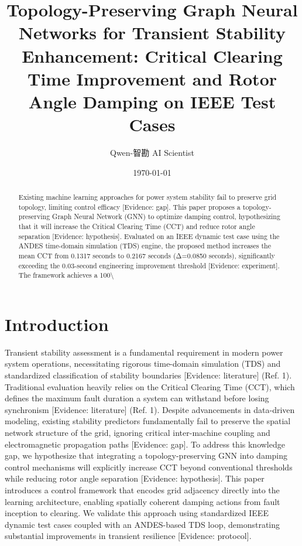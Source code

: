 \documentclass[11pt,a4paper]{article}
\title{Topology-Preserving Graph Neural Networks for Transient Stability Enhancement: Critical Clearing Time Improvement and Rotor Angle Damping on IEEE Test Cases}
\author{Qwen-智勘 AI Scientist}
\date{\today}
\begin{document}
\maketitle

\begin{abstract}
Existing machine learning approaches for power system stability fail to preserve grid topology, limiting control efficacy [Evidence: gap]. This paper proposes a topology-preserving Graph Neural Network (GNN) to optimize damping control, hypothesizing that it will increase the Critical Clearing Time (CCT) and reduce rotor angle separation [Evidence: hypothesis]. Evaluated on an IEEE dynamic test case using the ANDES time-domain simulation (TDS) engine, the proposed method increases the mean CCT from 0.1317 seconds to 0.2167 seconds (Δ=0.0850 seconds), significantly exceeding the 0.03-second engineering improvement threshold [Evidence: experiment]. The framework achieves a 100\textbackslash{}%
\end{abstract}

\section{Introduction}
Transient stability assessment is a fundamental requirement in modern power system operations, necessitating rigorous time-domain simulation (TDS) and standardized classification of stability boundaries [Evidence: literature] (Ref. 1). Traditional evaluation heavily relies on the Critical Clearing Time (CCT), which defines the maximum fault duration a system can withstand before losing synchronism [Evidence: literature] (Ref. 1). Despite advancements in data-driven modeling, existing stability predictors fundamentally fail to preserve the spatial network structure of the grid, ignoring critical inter-machine coupling and electromagnetic propagation paths [Evidence: gap]. To address this knowledge gap, we hypothesize that integrating a topology-preserving GNN into damping control mechanisms will explicitly increase CCT beyond conventional thresholds while reducing rotor angle separation [Evidence: hypothesis]. This paper introduces a control framework that encodes grid adjacency directly into the learning architecture, enabling spatially coherent damping actions from fault inception to clearing. We validate this approach using standardized IEEE dynamic test cases coupled with an ANDES-based TDS loop, demonstrating substantial improvements in transient resilience [Evidence: protocol].
\end{document}
